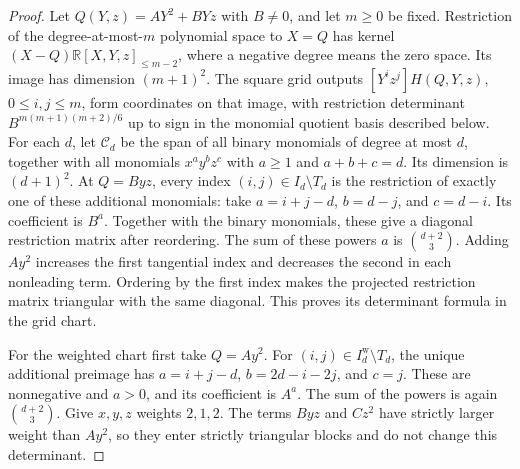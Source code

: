 \documentclass[11pt]{amsart}
\theoremstyle{definition}
\theoremstyle{remark}
\numberwithin{equation}{section}
\begin{document}
\begin{proof}
Let $Q(Y,z)=AY^2+BYz$ with $B\ne0$, and let $m\ge0$ be fixed. Restriction of the degree-at-most-$m$ polynomial space to $X=Q$ has kernel $(X-Q)\mathbb R[X,Y,z]_{\le m-2}$, where a negative degree means the zero space. Its image has dimension $(m+1)^2$. The square grid outputs $[Y^iz^j]H(Q,Y,z)$, $0\le i,j\le m$, form coordinates on that image, with restriction determinant $B^{m(m+1)(m+2)/6}$ up to sign in the monomial quotient basis described below.
For each $d$, let $\mathcal C_d$ be the span of all binary monomials of degree at most $d$, together with all monomials $x^ay^bz^c$ with $a\ge1$ and $a+b+c=d$. Its dimension is $(d+1)^2$. At $Q=Byz$, every index $(i,j)\in I_d\setminus T_d$ is the restriction of exactly one of these additional monomials: take $a=i+j-d$, $b=d-j$, and $c=d-i$. Its coefficient is $B^a$. Together with the binary monomials, these give a diagonal restriction matrix after reordering. The sum of these powers $a$ is $\binom{d+2}{3}$. Adding $Ay^2$ increases the first tangential index and decreases the second in each nonleading term. Ordering by the first index makes the projected restriction matrix triangular with the same diagonal. This proves its determinant formula in the grid chart.

For the weighted chart first take $Q=Ay^2$. For $(i,j)\in I_d^{\mathrm w}\setminus T_d$, the unique additional preimage has $a=i+j-d$, $b=2d-i-2j$, and $c=j$. These are nonnegative and $a>0$, and its coefficient is $A^a$. The sum of the powers is again $\binom{d+2}{3}$. Give $x,y,z$ weights $2,1,2$. The terms $Byz$ and $Cz^2$ have strictly larger weight than $Ay^2$, so they enter strictly triangular blocks and do not change this determinant.


\end{proof}
\end{document}
